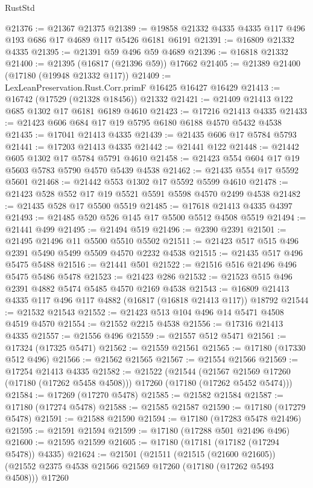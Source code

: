 \begin{lexlean}{RustStd}
\begin{coremodule}
{\begin{coremodule}
{{{{{{{{{{{{{{{{{{{{{{{{{{{{{{{{{{{{{{{{{{{{{{{{{{{{{{{@21376 := @21367 @21375
@21389 := @19858 @21332 @4335 @4335 @117 @496 @193 @686 @17 @4689 @117 @5426 @6181 @6191
@21391 := @16809 @21332 @4335
@21395 := @21391 @59 @496 @59 @4689
@21396 := @16818 @21332
@21400 := @21395 (@16817 (@21396 @59)) @17662
@21405 := @21389 @21400 (@17180 (@19948 @21332 @117))
@21409 := LexLeanPreservation.Rust.Corr.primF @16425 @16427 @16429
@21413 := @16742 (@17529 (@21328 @18456)) @21332
@21421 := @21409 @21413 @122 @685 @1302 @17 @6181 @6189 @4610
@21423 := @17216 @21413 @4335
@21433 := @21423 @606 @684 @17 @19 @5795 @6180 @6188 @4570 @5432 @4538
@21435 := @17041 @21413 @4335
@21439 := @21435 @606 @17 @5784 @5793
@21441 := @17203 @21413 @4335
@21442 := @21441 @122
@21448 := @21442 @605 @1302 @17 @5784 @5791 @4610
@21458 := @21423 @554 @604 @17 @19 @5603 @5783 @5790 @4570 @5439 @4538
@21462 := @21435 @554 @17 @5592 @5601
@21468 := @21442 @553 @1302 @17 @5592 @5599 @4610
@21478 := @21423 @528 @552 @17 @19 @5521 @5591 @5598 @4570 @2499 @4538
@21482 := @21435 @528 @17 @5500 @5519
@21485 := @17618 @21413 @4335 @4397
@21493 := @21485 @520 @526 @145 @17 @5500 @5512 @4508 @5519
@21494 := @21441 @499
@21495 := @21494 @519
@21496 := @2390 @2391
@21501 := @21495 @21496 @11 @5500 @5510 @5502
@21511 := @21423 @517 @515 @496 @2391 @5490 @5499 @5509 @4570 @2232 @4538
@21515 := @21435 @517 @496 @5475 @5488
@21516 := @21441 @501
@21522 := @21516 @516 @21496 @496 @5475 @5486 @5478
@21523 := @21423 @286
@21532 := @21523 @515 @496 @2391 @4882 @5474 @5485 @4570 @2169 @4538
@21543 := @16809 @21413 @4335 @117 @496 @117 @4882 (@16817 (@16818 @21413 @117)) @18792
@21544 := @21532 @21543
@21552 := @21423 @513 @104 @496 @14 @5471 @4508 @4519 @4570
@21554 := @21552 @2215 @4538
@21556 := @17316 @21413 @4335
@21557 := @21556 @496
@21559 := @21557 @512 @5471
@21561 := @17324 (@17325 @5471)
@21562 := @21559 @21561
@21565 := @17180 (@17330 @512 @496)
@21566 := @21562 @21565
@21567 := @21554 @21566
@21569 := @17254 @21413 @4335
@21582 := @21522
    (@21544
      (@21567 @21569 @17260 (@17180 (@17262 @5458 @4508)))
      @17260
      (@17180 (@17262 @5452 @5474)))
@21584 := @17269 (@17270 @5478)
@21585 := @21582 @21584
@21587 := @17180 (@17274 @5478)
@21588 := @21585 @21587
@21590 := @17180 (@17279 @5478)
@21591 := @21588 @21590
@21594 := @17180 (@17283 @5478 @21496)
@21595 := @21591 @21594
@21599 := @17180 (@17288 @501 @21496 @496)
@21600 := @21595 @21599
@21605 := @17180 (@17181 (@17182 (@17294 @5478)) @4335)
@21624 := @21501
    (@21511
      (@21515 (@21600 @21605))
      (@21552 @2375 @4538 @21566 @21569 @17260 (@17180 (@17262 @5493 @4508)))
      @17260
}}}}}}}}}}}}}}}}}}}}}}}}}}}}}}}}}}}}}}}}}}}}}}}}}}}}}}}
\end{coremodule}}
\end{coremodule}
\end{lexlean}
